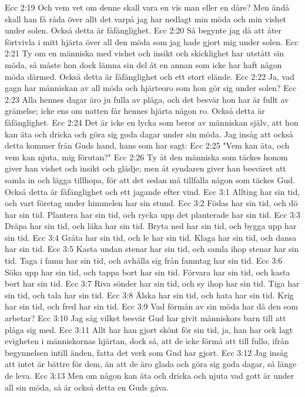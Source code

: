 Ecc 2:19  Och vem vet om denne skall vara en vis man eller en dåre? Men ändå skall han få råda över allt det varpå jag har nedlagt min möda och min vishet under solen. Också detta är fåfänglighet.
Ecc 2:20  Så begynte jag då att åter förtvivla i mitt hjärta över all den möda som jag hade gjort mig under solen.
Ecc 2:21  Ty om en människa med vishet och insikt och skicklighet har utstått sin möda, så måste hon dock lämna sin del åt en annan som icke har haft någon möda därmed. Också detta är fåfänglighet och ett stort elände.
Ecc 2:22  Ja, vad gagn har människan av all möda och hjärteoro som hon gör sig under solen?
Ecc 2:23  Alla hennes dagar äro ju fulla av plåga, och det besvär hon har är fullt av grämelse; icke ens om natten får hennes hjärta någon ro. Också detta är fåfänglighet.
Ecc 2:24  Det är icke en lycka som beror av människan själv, att hon kan äta och dricka och göra sig goda dagar under sin möda. Jag insåg att också detta kommer från Guds hand, hans som har sagt:
Ecc 2:25  "Vem kan äta, och vem kan njuta, mig förutan?"
Ecc 2:26  Ty åt den människa som täckes honom giver han vishet och insikt och glädje; men åt syndaren giver han besväret att samla in och lägga tillhopa, för att det sedan må tillfalla någon som täckes Gud. Också detta är fåfänglighet och ett jagande efter vind.
Ecc 3:1  Allting har sin tid, och vart företag under himmelen har sin stund.
Ecc 3:2  Födas har sin tid, och dö har sin tid. Plantera har sin tid, och rycka upp det planterade har sin tid.
Ecc 3:3  Dräpa har sin tid, och läka har sin tid. Bryta ned har sin tid, och bygga upp har sin tid.
Ecc 3:4  Gråta har sin tid, och le har sin tid. Klaga har sin tid, och dansa har sin tid.
Ecc 3:5  Kasta undan stenar har sin tid, och samla ihop stenar har sin tid. Taga i famn har sin tid, och avhålla sig från famntag har sin tid.
Ecc 3:6  Söka upp har sin tid, och tappa bort har sin tid. Förvara har sin tid, och kasta bort har sin tid.
Ecc 3:7  Riva sönder har sin tid, och sy ihop har sin tid. Tiga har sin tid, och tala har sin tid.
Ecc 3:8  Älska har sin tid, och hata har sin tid. Krig har sin tid, och fred har sin tid.
Ecc 3:9  Vad förmån av sin möda har då den som arbetar?
Ecc 3:10  Jag såg vilket besvär Gud har givit människors barn till att plåga sig med.
Ecc 3:11  Allt har han gjort skönt för sin tid, ja, han har ock lagt evigheten i människornas hjärtan, dock så, att de icke förmå att till fullo, ifrån begynnelsen intill änden, fatta det verk som Gud har gjort.
Ecc 3:12  Jag insåg att intet är bättre för dem, än att de äro glada och göra sig goda dagar, så länge de leva.
Ecc 3:13  Men om någon kan äta och dricka och njuta vad gott är under all sin möda, så är också detta en Guds gåva.
